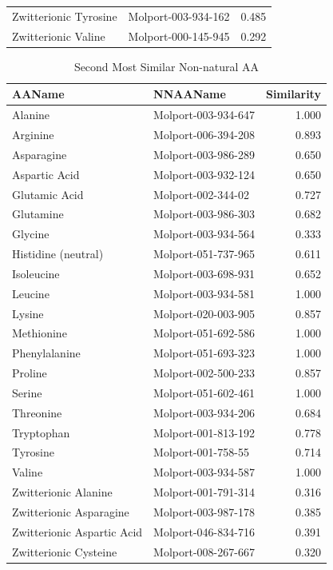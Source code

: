 \documentclass[a4paper,11pt]{article}\usepackage[]{graphicx}\usepackage[]{xcolor}
\begin{document}
\begin{enumerate}
\begin{table}[H]
\begin{tabular}[t]{llr}
Zwitterionic Tyrosine & Molport-003-934-162 & 0.485\\
Zwitterionic Valine & Molport-000-145-945 & 0.292\\
\bottomrule
\end{tabular}
\end{table} \captionsetup{margin = 55pt}
\begin{table}[H] \captionsetup{margin = 55pt}
\centering
\caption{\label{tab:most2}Second Most Similar Non-natural AA}
\centering
\fontsize{10}{12}\selectfont
\begin{tabular}[t]{llr}
\toprule
AAName & NNAAName & Similarity\\
\midrule
Alanine & Molport-003-934-647 & 1.000\\
Arginine & Molport-006-394-208 & 0.893\\
Asparagine & Molport-003-986-289 & 0.650\\
Aspartic Acid & Molport-003-932-124 & 0.650\\
Glutamic Acid & Molport-002-344-02 & 0.727\\
Glutamine & Molport-003-986-303 & 0.682\\
Glycine & Molport-003-934-564 & 0.333\\
Histidine (neutral) & Molport-051-737-965 & 0.611\\
Isoleucine & Molport-003-698-931 & 0.652\\
Leucine & Molport-003-934-581 & 1.000\\
Lysine & Molport-020-003-905 & 0.857\\
Methionine & Molport-051-692-586 & 1.000\\
Phenylalanine & Molport-051-693-323 & 1.000\\
Proline & Molport-002-500-233 & 0.857\\
Serine & Molport-051-602-461 & 1.000\\
Threonine & Molport-003-934-206 & 0.684\\
Tryptophan & Molport-001-813-192 & 0.778\\
Tyrosine & Molport-001-758-55 & 0.714\\
Valine & Molport-003-934-587 & 1.000\\
Zwitterionic Alanine & Molport-001-791-314 & 0.316\\
Zwitterionic Asparagine & Molport-003-987-178 & 0.385\\
Zwitterionic Aspartic Acid & Molport-046-834-716 & 0.391\\
Zwitterionic Cysteine & Molport-008-267-667 & 0.320\\

\end{tabular}
\end{table}
\end{enumerate}
\end{document}

